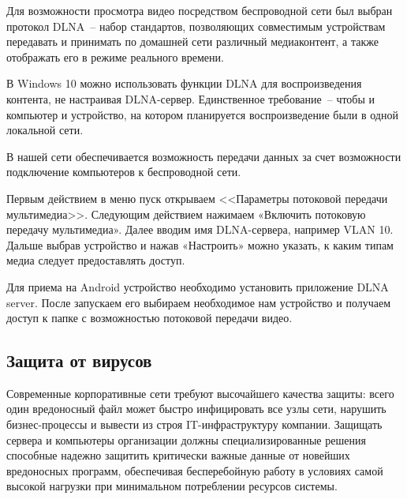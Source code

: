 Для возможности просмотра видео посредством беспроводной сети был выбран протокол DLNA~-- набор стандартов, позволяющих совместимым устройствам передавать и принимать по домашней сети различный медиаконтент, а также отображать его в режиме реального времени.

В Windows 10 можно использовать функции DLNA для воспроизведения контента, не настраивая DLNA-сервер. Единственное требование~-- чтобы и компьютер и устройство, на котором планируется воспроизведение были в одной локальной сети.

В нашей сети обеспечивается возможность передачи данных за счет возможности подключение компьютеров к беспроводной сети.

Первым действием в меню пуск открываем <<Параметры потоковой передачи мультимедиа>>. Следующим действием нажимаем «Включить потоковую передачу мультимедиа». Далее вводим имя DLNA-сервера, например VLAN 10. Дальше выбрав устройство и нажав «Настроить» можно указать, к каким типам медиа следует предоставлять доступ. 

Для приема на Android устройство необходимо установить приложение DLNA server. После запускаем его выбираем необходимое нам устройство и получаем доступ к папке с возможностью потоковой передачи видео. 

\subsection{Защита от вирусов}

Современные корпоративные сети требуют высочайшего качества защиты: всего один вредоносный файл может быстро инфицировать все узлы сети, нарушить бизнес-процессы и вывести из строя IT-инфраструктуру компании. Защищать сервера и компьютеры организации должны специализированные решения способные надежно защитить критически важные данные от новейших вредоносных программ, обеспечивая бесперебойную работу в условиях самой высокой нагрузки при минимальном потреблении ресурсов системы. 

